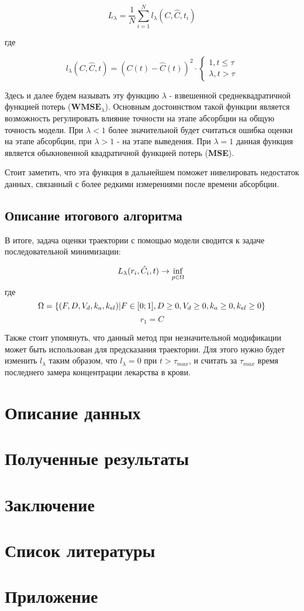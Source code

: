 \documentclass[12pt]{article}
\begin{document}
\[
	L_{\lambda} = \frac{1}{N} \sum_{i=1}^{N} l_{\lambda}(C, \hat{C}, t_i)
\]

где

\[
	l_{\lambda}(C, \hat{C}, t) = (C(t) - \hat{C}(t)) ^ 2 \cdot \begin{cases}
		1, t \leq \tau \\
		\lambda, t > \tau
	\end{cases}
\]

Здесь и далее будем называть эту функцию $\lambda$ - взвешенной среднеквадратичной функцией потерь ($\textbf{WMSE}_{\lambda}$). Основным достоинством такой функции является возможность регулировать влияние точности на этапе абсорбции на общую точность модели. При $\lambda < 1$ более значительной будет считаться ошибка оценки на этапе абсорбции, при $\lambda > 1$ - на этапе выведения. При $\lambda = 1$ данная функция является обыкновенной квадратичной функцией потерь (\textbf{MSE}).

Стоит заметить, что эта функция в дальнейшем поможет нивелировать недостаток данных, связанный с более редкими измерениями после времени абсорбции.

\subsection{Описание итогового алгоритма}

В итоге, задача оценки траектории с помощью модели сводится к задаче последовательной минимизации:


\[
	L_{\lambda}(r_i, \hat{C}_i, t) \rightarrow \inf_{p \in \Omega}                                          \\
\]
где
\[
	\Omega = \{ (F, D, V_d, k_a, k_{el}) | F \in [0; 1], D \geq 0, V_d \geq 0, k_a \geq 0, k_{el} \geq 0 \} \\
\]
\[
	r_1 = C
\]

Также стоит упомянуть, что данный метод при незначительной модификации может быть использован для предсказания траектории. Для этого нужно будет изменить $l_{\lambda}$ таким образом, что $l_{\lambda} = 0$ при $t > \tau_{max}$, и считать за $\tau_{max}$ время последнего замера концентрации лекарства в крови.
\newpage

\section{Описание данных}

\newpage

\section{Полученные результаты}

\newpage

\section{Заключение}

\newpage

\section{Список литературы}

\newpage

\section{Приложение}
\end{document}
